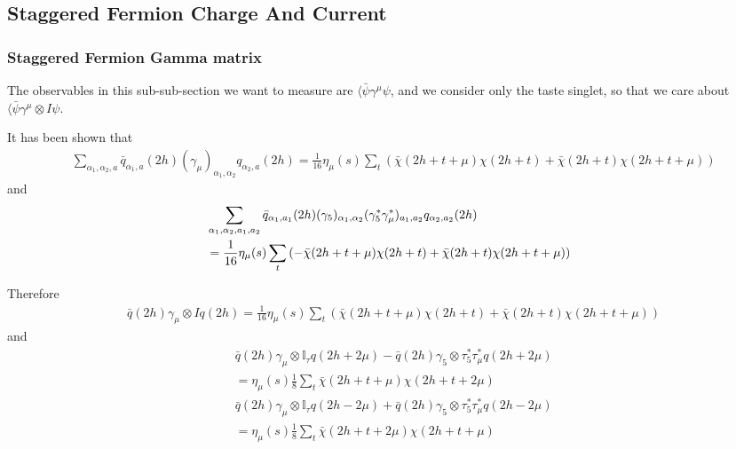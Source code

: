 \subsection{\label{StaggeredFermionSpectrumChargeAndCurrent}Staggered Fermion Charge And Current}

\subsubsection{\label{StaggeredFermionGammaMatrix}Staggered Fermion Gamma matrix}

The observables in this sub-sub-section we want to measure are $\langle \bar{\psi} \gamma ^{\mu} \psi$, and we consider only the taste singlet, so that we care about $\langle \bar{\psi} \gamma ^{\mu}\otimes I \psi$.

It has been shown that
\textcolor[rgb]{0,0.5,0}{
\begin{equation}
\begin{split}
&\sum _{\alpha_1,\alpha _2,a} \bar{q}_{\alpha_1,a}(2h)(\gamma _{\mu})_{\alpha_1,\alpha_2} q_{\alpha _2,a}(2h) = \frac{1}{16} \eta _{\mu}(s)\sum _{t} \left(\bar{\chi}(2h+t+\mu)\chi (2h+t) +  \bar{\chi}(2h+t)\chi (2h+t+\mu)\right)
\end{split}
\end{equation}
and
\begin{equation}
\begin{split}
&\sum _{\alpha_1,\alpha _2,a_1,a_2} \bar{q}_{\alpha_1,a_1}(2h)(\gamma _5)_{\alpha_1,\alpha_2} (\gamma _5^*\gamma _{\mu}^*)_{a_1,a_2}q_{\alpha _2,a_2}(2h) \\
&= \frac{1}{16} \eta _{\mu}(s)\sum _{t} \left(\textcolor[rgb]{1,0,0}{-}\bar{\chi}(2h+t+\mu)\chi (2h+t) +  \bar{\chi}(2h+t)\chi (2h+t+\mu)\right)
\end{split}
\end{equation}}

Therefore
\textcolor[rgb]{0,0,1}{
\begin{equation}
\begin{split}
&\bar{q}(2h)\gamma _{\mu}\otimes I q(2h) = \frac{1}{16} \eta _{\mu}(s)\sum _{t} \left(\bar{\chi}(2h+t+\mu)\chi (2h+t) +  \bar{\chi}(2h+t)\chi (2h+t+\mu)\right)
\end{split}
\end{equation}
and
\begin{equation}
\begin{split}
&\bar{q}(2h)\gamma _{\mu}\otimes \mathbb{I}_{\tau} q(2h+2\mu) - \bar{q}(2h)\gamma _5\otimes \tau _5^*\tau _{\mu}^* q(2h+2\mu)\\
&=\eta _{\mu}(s)\frac{1}{8}\sum _{t} \bar{\chi}(2h+t+\mu)\chi (2h+t+2\mu)\\
&\bar{q}(2h)\gamma _{\mu}\otimes \mathbb{I}_{\tau} q(2h-2\mu) + \bar{q}(2h)\gamma _5\otimes \tau _5^*\tau _{\mu}^* q(2h-2\mu)\\
&=\eta _{\mu}(s)\frac{1}{8}\sum _{t} \bar{\chi}(2h+t+2\mu)\chi (2h+t+\mu)\\
\end{split}
\end{equation}}

